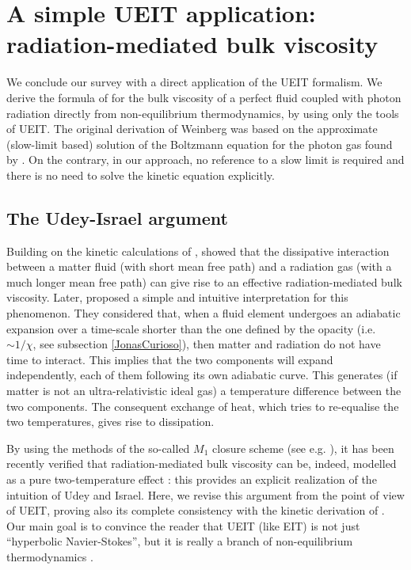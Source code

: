 \documentclass[a4paper, amsfonts, amssymb, amsmath, reprint, twocolumn, showkeys, nofootinbib]{revtex4-2}
\begin{document}
\section{A simple UEIT application: radiation-mediated bulk viscosity}
\label{TwoTemper}

We conclude our survey with a  direct application of the UEIT formalism. We derive the formula of \citet{Weinberg1971} for the bulk viscosity of a perfect fluid coupled with photon radiation directly from non-equilibrium thermodynamics, by using only the tools of UEIT. The original derivation of Weinberg was based on the approximate (slow-limit based) solution of the Boltzmann equation for the photon gas found by \citet{Thomas1930}. On the contrary, in our approach, no reference to a slow limit is required and there is no need to solve the kinetic equation explicitly.



\subsection{The Udey-Israel argument} 

Building on the kinetic calculations of \citet{Thomas1930}, \citet{Weinberg1971} showed that the dissipative interaction between a matter fluid (with short mean free path) and a radiation gas (with a much longer mean free path) can give rise to an effective radiation-mediated bulk viscosity. Later, \citet{UdeyIsrael1982} proposed a simple and intuitive interpretation for this phenomenon. They considered that, when a fluid element undergoes an adiabatic expansion  over a time-scale shorter than the one defined by the opacity (i.e. $\sim 1/\chi$, see subsection \ref{JonasCurioso}), then matter and radiation do not have time to interact. This implies that the two components will expand independently, each of them following its own adiabatic curve. This generates (if matter is not an ultra-relativistic ideal gas) a temperature difference between the two components. The consequent exchange of heat, which tries to re-equalise the two temperatures, gives rise to dissipation.

By using the methods of the so-called $M_1$ closure scheme (see e.g. \citet{Sadowski2013}), it has been recently verified that radiation-mediated bulk viscosity can be, indeed, modelled as a pure two-temperature effect \citep{GavassinoRadiazione}: this provides an explicit realization of the intuition of Udey and Israel. Here, we revise this argument  from the point of view of UEIT, proving also its complete consistency with the kinetic derivation of \citet{Weinberg1971}. Our main goal is to convince the reader that UEIT (like EIT) is not just ``hyperbolic Navier-Stokes'', but it is really a branch of non-equilibrium thermodynamics \cite{AnilePavon1998}.
\end{document}
